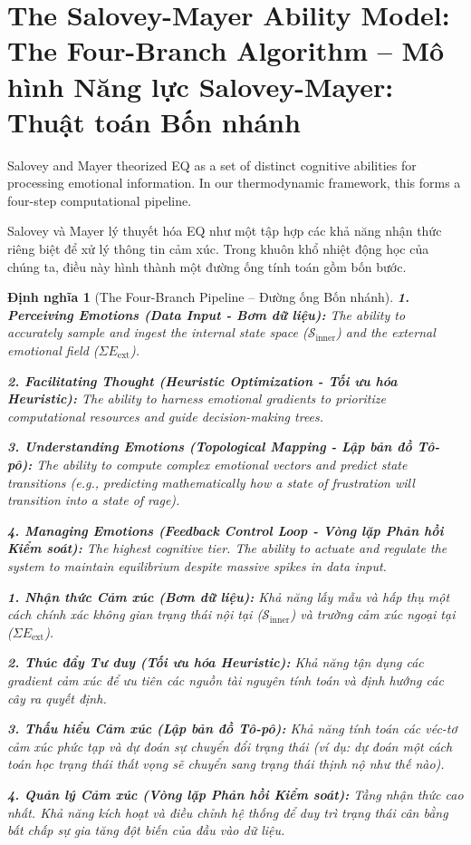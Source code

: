 \documentclass{report}
\newtheorem{dinhnghia}{Định nghĩa}
\begin{document}
\section{The Salovey-Mayer Ability Model: The Four-Branch Algorithm -- Mô hình Năng lực Salovey-Mayer: Thuật toán Bốn nhánh}

Salovey and Mayer theorized EQ as a set of distinct cognitive abilities for processing emotional information. In our thermodynamic framework, this forms a four-step computational pipeline.

Salovey và Mayer lý thuyết hóa EQ như một tập hợp các khả năng nhận thức riêng biệt để xử lý thông tin cảm xúc. Trong khuôn khổ nhiệt động học của chúng ta, điều này hình thành một đường ống tính toán gồm bốn bước.

\begin{dinhnghia}[The Four-Branch Pipeline -- Đường ống Bốn nhánh]
	\textbf{1. Perceiving Emotions (Data Input - Bơm dữ liệu):} The ability to accurately sample and ingest the internal state space ($\mathcal{S}_{\text{inner}}$) and the external emotional field ($\Sigma E_{\text{ext}}$). 
	
	\textbf{2. Facilitating Thought (Heuristic Optimization - Tối ưu hóa Heuristic):} The ability to harness emotional gradients to prioritize computational resources and guide decision-making trees.
	
	\textbf{3. Understanding Emotions (Topological Mapping - Lập bản đồ Tô-pô):} The ability to compute complex emotional vectors and predict state transitions (e.g., predicting mathematically how a state of frustration will transition into a state of rage).
	
	\textbf{4. Managing Emotions (Feedback Control Loop - Vòng lặp Phản hồi Kiểm soát):} The highest cognitive tier. The ability to actuate and regulate the system to maintain equilibrium despite massive spikes in data input.
	
	\textbf{1. Nhận thức Cảm xúc (Bơm dữ liệu):} Khả năng lấy mẫu và hấp thụ một cách chính xác không gian trạng thái nội tại ($\mathcal{S}_{\text{inner}}$) và trường cảm xúc ngoại tại ($\Sigma E_{\text{ext}}$).
	
	\textbf{2. Thúc đẩy Tư duy (Tối ưu hóa Heuristic):} Khả năng tận dụng các gradient cảm xúc để ưu tiên các nguồn tài nguyên tính toán và định hướng các cây ra quyết định.
	
	\textbf{3. Thấu hiểu Cảm xúc (Lập bản đồ Tô-pô):} Khả năng tính toán các véc-tơ cảm xúc phức tạp và dự đoán sự chuyển đổi trạng thái (ví dụ: dự đoán một cách toán học trạng thái thất vọng sẽ chuyển sang trạng thái thịnh nộ như thế nào).
	
	\textbf{4. Quản lý Cảm xúc (Vòng lặp Phản hồi Kiểm soát):} Tầng nhận thức cao nhất. Khả năng kích hoạt và điều chỉnh hệ thống để duy trì trạng thái cân bằng bất chấp sự gia tăng đột biến của đầu vào dữ liệu.
\end{dinhnghia}
\end{document}
